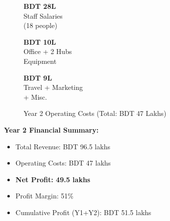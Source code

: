 \begin{figure}[H]
    \centering
    \noindent
    \begin{minipage}[t]{0.32\textwidth}
        \begin{tcolorbox}[colback=BoxBlue,colframe=SecondaryBlue,arc=5pt,boxrule=1pt,
            halign=center,top=6pt,bottom=6pt]
            {\large\bfseries\color{PrimaryBlue}BDT 28L}\\[2pt]
            {\small\color{DarkGrey}Staff Salaries\\(18 people)}
        \end{tcolorbox}
    \end{minipage}\hfill
    \begin{minipage}[t]{0.32\textwidth}
        \begin{tcolorbox}[colback=BoxBlue,colframe=SecondaryBlue,arc=5pt,boxrule=1pt,
            halign=center,top=6pt,bottom=6pt]
            {\large\bfseries\color{PrimaryBlue}BDT 10L}\\[2pt]
            {\small\color{DarkGrey}Office + 2 Hubs\\Equipment}
        \end{tcolorbox}
    \end{minipage}\hfill
    \begin{minipage}[t]{0.32\textwidth}
        \begin{tcolorbox}[colback=BoxBlue,colframe=SecondaryBlue,arc=5pt,boxrule=1pt,
            halign=center,top=6pt,bottom=6pt]
            {\large\bfseries\color{PrimaryBlue}BDT 9L}\\[2pt]
            {\small\color{DarkGrey}Travel + Marketing\\+ Misc.}
        \end{tcolorbox}
    \end{minipage}
    \caption{Year 2 Operating Costs (Total: BDT 47 Lakhs)}
    \label{tab:year2_costs}
\end{figure}

\textbf{Year 2 Financial Summary:}
\begin{itemize}
    \item Total Revenue: BDT 96.5 lakhs
    \item Operating Costs: BDT 47 lakhs
    \item \textcolor{AccentGreen}{\textbf{Net Profit: 49.5 lakhs}}
    \item Profit Margin: 51\%
    \item Cumulative Profit (Y1+Y2): BDT 51.5 lakhs
\end{itemize}

